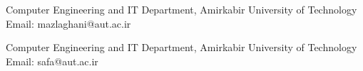 

\begin{cventries}

{Computer Engineering and IT Department, Amirkabir University of Technology}
{Email: mazlaghani@aut.ac.ir}{}

{Computer Engineering and IT Department, Amirkabir University of Technology}
{Email: safa@aut.ac.ir}{}

\end{cventries}

